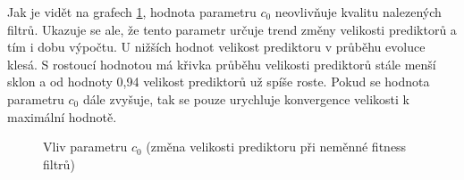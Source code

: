 Jak je vidět na grafech \ref{plotZerocoef-30kg}, hodnota parametru $c_0$ neovlivňuje kvalitu nalezených filtrů. Ukazuje se ale, že tento parametr určuje trend změny velikosti prediktorů a tím i dobu výpočtu. U nižších hodnot velikost prediktoru v průběhu evoluce klesá. S rostoucí hodnotou má křivka průběhu velikosti prediktorů stále menší sklon a od hodnoty 0,94 velikost prediktorů už spíše roste. Pokud se hodnota parametru $c_0$ dále zvyšuje, tak se pouze urychluje konvergence velikosti k maximální hodnotě.

\begin{figure}[tbp]
    \centering
    \caption{Vliv parametru $c_0$ (změna velikosti prediktoru při neměnné fitness filtrů)}
    \label{plotZerocoef-30kg}
\end{figure}

